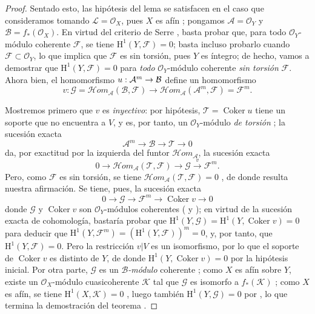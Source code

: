 \documentclass[oneside,10pt]{amsart}
\makeatletter
\newcommand{\ega@arrow}[2]{\mathchoice{#1}{#2}{#2}{#2}}
\renewcommand{\to}{\ega@arrow{\longrightarrow}{\rightarrow}}
\newcommand{\oldpage}[2][]{\marginnote{\normalfont\footnotesize\textbf{#1}~|~#2}\ignorespaces}
\makeatother
\begin{document}
\begin{proof}
Sentado esto, las hipótesis del lema  se satisfacen en el caso que consideramos tomando $\mathcal{L}=\mathcal{O}_X$, pues $X$ es afín ;
pongamos $\mathcal{A}=\mathcal{O}_Y$ y $\mathcal{B}=f_*(\mathcal{O}_X)$.
En virtud del criterio de Serre , basta probar que, para todo $\mathcal{O}_Y$-módulo coherente $\mathcal{F}$, se tiene $\mathrm{H}^1(Y,\mathcal{F})=0$;
basta incluso probarlo cuando $\mathcal{F}\subset\mathcal{O}_Y$, lo que implica que $\mathcal{F}$ es sin torsión, pues $Y$ es íntegro;
de hecho, vamos a demostrar que $\mathrm{H}^1(Y,\mathcal{F})=0$ para \emph{todo} $\mathcal{O}_Y$-módulo coherente \emph{sin torsión} $\mathcal{F}$.
Ahora bien, el homomorfismo $u:\mathcal{A}^m\to\mathcal{B}$ define un homomorfismo
\[
v:\mathcal{G}
=\mathcal{H}om_{\mathcal{A}}(\mathcal{B},\mathcal{F})
\longrightarrow
\mathcal{H}om_{\mathcal{A}}(\mathcal{A}^m,\mathcal{F})
=\mathcal{F}^m.
\]

Mostremos primero que $v$ es \emph{inyectivo}:
por hipótesis, $\mathcal{T}=\operatorname{Coker}u$ tiene un soporte que no encuentra a $V$, y es, por tanto, un $\mathcal{O}_Y$-módulo \emph{de torsión} ;
la sucesión exacta
\[
\mathcal{A}^m\longrightarrow\mathcal{B}\longrightarrow\mathcal{T}
\longrightarrow0
\]
da, por exactitud por la izquierda del funtor $\mathcal{H}om_{\mathcal{A}}$, la sucesión exacta
\[
0\longrightarrow
\mathcal{H}om_{\mathcal{A}}(\mathcal{T},\mathcal{F})
\longrightarrow\mathcal{G}\xrightarrow{v}\mathcal{F}^m.
\]
Pero, como $\mathcal{F}$ es sin torsión, se tiene
$\mathcal{H}om_{\mathcal{A}}(\mathcal{T},\mathcal{F})=0$
, de donde resulta nuestra afirmación.
Se tiene, pues, la sucesión exacta
\[
0\longrightarrow\mathcal{G}\longrightarrow\mathcal{F}^m
\longrightarrow\operatorname{Coker}v\longrightarrow0
\]
\oldpage[II]{138}
donde $\mathcal{G}$ y $\operatorname{Coker}v$ son $\mathcal{O}_Y$-módulos coherentes ( y );
en virtud de la sucesión exacta de cohomología, bastaría probar que
$\mathrm{H}^1(Y,\mathcal{G})
=\mathrm{H}^1(Y,\operatorname{Coker}v)=0$
para deducir que
$\mathrm{H}^1(Y,\mathcal{F}^m)
=(\mathrm{H}^1(Y,\mathcal{F}))^m=0$,
y, por tanto, que $\mathrm{H}^1(Y,\mathcal{F})=0$.
Pero la restricción $v|V$ es un isomorfismo, por lo que el soporte de $\operatorname{Coker}v$ es distinto de $Y$, de donde
$\mathrm{H}^1(Y,\operatorname{Coker}v)=0$
por la hipótesis inicial.
Por otra parte, $\mathcal{G}$ es un \emph{$\mathcal{B}$-módulo} coherente ;
como $X$ es afín sobre $Y$, existe un $\mathcal{O}_X$-módulo cuasicoherente $\mathcal{K}$ tal que $\mathcal{G}$ es isomorfo a $f_*(\mathcal{K})$ ;
como $X$ es afín, se tiene $\mathrm{H}^1(X,\mathcal{K})=0$ , luego también $\mathrm{H}^1(Y,\mathcal{G})=0$ por , lo que termina la demostración del teorema .
\end{proof}
\end{document}
